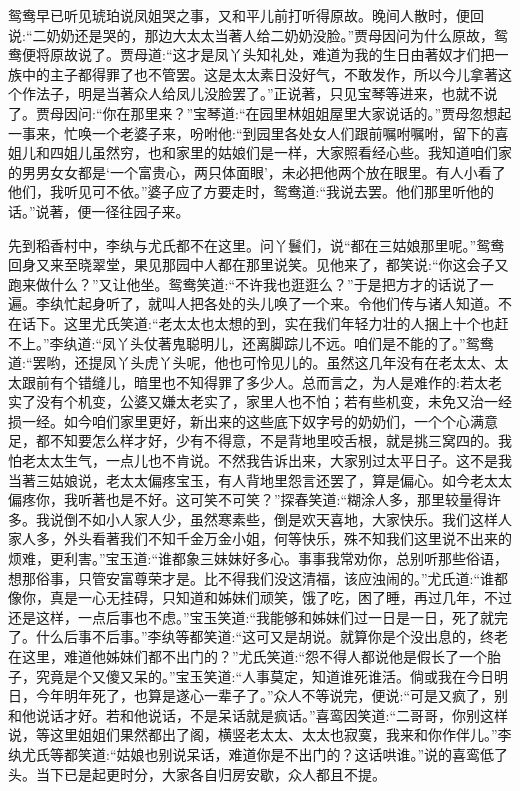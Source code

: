 \begin{parag}
    鸳鸯早已听见琥珀说凤姐哭之事，又和平儿前打听得原故。晚间人散时，便回说:“二奶奶还是哭的，那边大太太当著人给二奶奶没脸。”贾母因问为什么原故，鸳鸯便将原故说了。贾母道:“这才是凤丫头知礼处，难道为我的生日由著奴才们把一族中的主子都得罪了也不管罢。这是太太素日没好气，不敢发作，所以今儿拿著这个作法子，明是当著众人给凤儿没脸罢了。”正说著，只见宝琴等进来，也就不说了。贾母因问:“你在那里来？”宝琴道:“在园里林姐姐屋里大家说话的。”贾母忽想起一事来，忙唤一个老婆子来，吩咐他:“到园里各处女人们跟前嘱咐嘱咐，留下的喜姐儿和四姐儿虽然穷，也和家里的姑娘们是一样，大家照看经心些。我知道咱们家的男男女女都是‘一个富贵心，两只体面眼’，未必把他两个放在眼里。有人小看了他们，我听见可不依。”婆子应了方要走时，鸳鸯道:“我说去罢。他们那里听他的话。”说著，便一径往园子来。
\end{parag}


\begin{parag}
    先到稻香村中，李纨与尤氏都不在这里。问丫鬟们，说“都在三姑娘那里呢。”鸳鸯回身又来至晓翠堂，果见那园中人都在那里说笑。见他来了，都笑说:“你这会子又跑来做什么？”又让他坐。鸳鸯笑道:“不许我也逛逛么？”于是把方才的话说了一遍。李纨忙起身听了，就叫人把各处的头儿唤了一个来。令他们传与诸人知道。不在话下。这里尤氏笑道:“老太太也太想的到，实在我们年轻力壮的人捆上十个也赶不上。”李纨道:“凤丫头仗著鬼聪明儿，还离脚踪儿不远。咱们是不能的了。”鸳鸯道:“罢哟，还提凤丫头虎丫头呢，他也可怜见儿的。虽然这几年没有在老太太、太太跟前有个错缝儿，暗里也不知得罪了多少人。总而言之，为人是难作的:若太老实了没有个机变，公婆又嫌太老实了，家里人也不怕；若有些机变，未免又治一经损一经。如今咱们家里更好，新出来的这些底下奴字号的奶奶们，一个个心满意足，都不知要怎么样才好，少有不得意，不是背地里咬舌根，就是挑三窝四的。我怕老太太生气，一点儿也不肯说。不然我告诉出来，大家别过太平日子。这不是我当著三姑娘说，老太太偏疼宝玉，有人背地里怨言还罢了，算是偏心。如今老太太偏疼你，我听著也是不好。这可笑不可笑？”探春笑道:“糊涂人多，那里较量得许多。我说倒不如小人家人少，虽然寒素些，倒是欢天喜地，大家快乐。我们这样人家人多，外头看著我们不知千金万金小姐，何等快乐，殊不知我们这里说不出来的烦难，更利害。”宝玉道:“谁都象三妹妹好多心。事事我常劝你，总别听那些俗语，想那俗事，只管安富尊荣才是。比不得我们没这清福，该应浊闹的。”尤氏道:“谁都像你，真是一心无挂碍，只知道和姊妹们顽笑，饿了吃，困了睡，再过几年，不过还是这样，一点后事也不虑。”宝玉笑道:“我能够和姊妹们过一日是一日，死了就完了。什么后事不后事。”李纨等都笑道:“这可又是胡说。就算你是个没出息的，终老在这里，难道他姊妹们都不出门的？”尤氏笑道:“怨不得人都说他是假长了一个胎子，究竟是个又傻又呆的。”宝玉笑道:“人事莫定，知道谁死谁活。倘或我在今日明日，今年明年死了，也算是遂心一辈子了。”众人不等说完，便说:“可是又疯了，别和他说话才好。若和他说话，不是呆话就是疯话。”喜鸾因笑道:“二哥哥，你别这样说，等这里姐姐们果然都出了阁，横竖老太太、太太也寂寞，我来和你作伴儿。”李纨尤氏等都笑道:“姑娘也别说呆话，难道你是不出门的？这话哄谁。”说的喜鸾低了头。当下已是起更时分，大家各自归房安歇，众人都且不提。
\end{parag}


